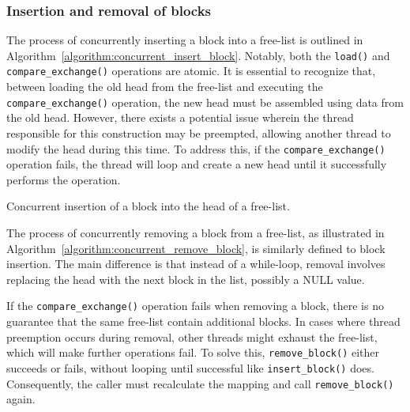 \subsubsection{Insertion and removal of blocks}

The process of concurrently inserting a block into a free-list is outlined in Algorithm~\ref{algorithm:concurrent_insert_block}. Notably, both the \texttt{load()} and \texttt{compare\_exchange()} operations are atomic. It is essential to recognize that, between loading the old head from the free-list and executing the \texttt{compare\_exchange()} operation, the new head must be assembled using data from the old head. However, there exists a potential issue wherein the thread responsible for this construction may be preempted, allowing another thread to modify the head during this time. To address this, if the \texttt{compare\_exchange()} operation fails, the thread will loop and create a new head until it successfully performs the operation.

\begin{algorithm}[H]
    \SetAlgoLined

\label{algorithm:concurrent_insert_block}
\caption{Concurrent insertion of a block into the head of a free-list.}
\end{algorithm}

The process of concurrently removing a block from a free-list, as illustrated in Algorithm~\ref{algorithm:concurrent_remove_block}, is similarly defined to block insertion. The main difference is that instead of a while-loop, removal involves replacing the head with the next block in the list, possibly a NULL value.

If the \texttt{compare\_exchange()} operation fails when removing a block, there is no guarantee that the same free-list contain additional blocks. In cases where thread preemption occurs during removal, other threads might exhaust the free-list, which will make further operations fail. To solve this, \texttt{remove\_block()} either succeeds or fails, without looping until successful like \texttt{insert\_block()} does. Consequently, the caller must recalculate the mapping and call \texttt{remove\_block()} again.

